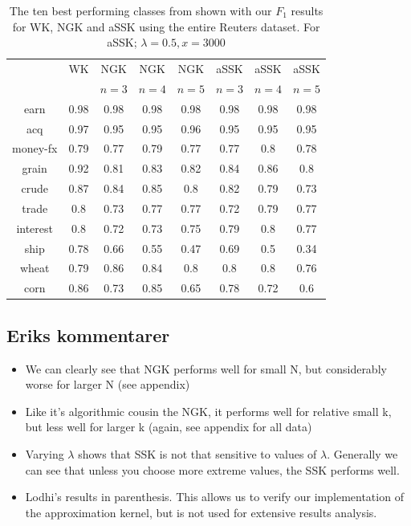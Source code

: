 \begin{table}
	\centering	
	\begin{tabular}{| c | c | c | c | c | c | c | c |}\hline
		& WK & NGK & NGK  & NGK  & aSSK & aSSK& aSSK \\ 
		&  & $n = 3$& $ n = 4 $ & $ n = 5 $ & $ n = 3 $& $ n = 4 $ & $ n = 5 $ \\ \hline
		earn & 0.98 & 0.98 &  0.98&  0.98 & 0.98 & 0.98 & 0.98 \\ \hline
		acq & 0.97 & 0.95 &  0.95 &  0.96 & 0.95 & 0.95 & 0.95 \\ \hline
		money-fx & 0.79 & 0.77 &  0.79 & 0.77 & 0.77 & 0.8 & 0.78 \\ \hline
		grain & 0.92 & 0.81 &  0.83& 0.82 & 0.84 & 0.86 & 0.8 \\ \hline
		crude & 0.87 & 0.84 &  0.85 & 0.8 & 0.82 & 0.79 & 0.73 \\ \hline
		trade & 0.8 & 0.73 &  0.77 & 0.77 & 0.72 & 0.79 & 0.77 \\ \hline
		interest & 0.8 & 0.72 &  0.73 & 0.75 & 0.79 & 0.8 & 0.77 \\ \hline
		ship & 0.78 & 0.66 &  0.55 & 0.47 & 0.69 & 0.5 & 0.34 \\ \hline
		wheat & 0.79 & 0.86 &  0.84 & 0.8 & 0.8 & 0.8 & 0.76 \\ \hline
		corn & 0.86 & 0.73 &  0.85 & 0.65 & 0.78 & 0.72 & 0.6 \\ \hline	
	\end{tabular}
\caption{The ten best performing classes from \cite{lodhi} shown with our $ F_1 $ results for WK, NGK and  aSSK using the entire Reuters dataset. For aSSK; $ \lambda = 0.5, x = 3000$\label{tab:full_data} }
\end{table}


\subsection{Eriks kommentarer}
\begin{itemize}
	\item We can clearly see that NGK performs well for small N, but considerably worse for larger N (see appendix)
	
	\item Like it's algorithmic cousin the NGK, it performs well for relative small k, but less well for larger k (again, see appendix for all data)
	
	\item  Varying $ \lambda $ shows that SSK is not that sensitive to values of $ \lambda $. Generally we can see that unless you choose more extreme values, the SSK performs well.
	
	\item Lodhi's results in parenthesis. This allows us to verify our implementation of the approximation kernel, but is not used for extensive results analysis.
\end{itemize}
